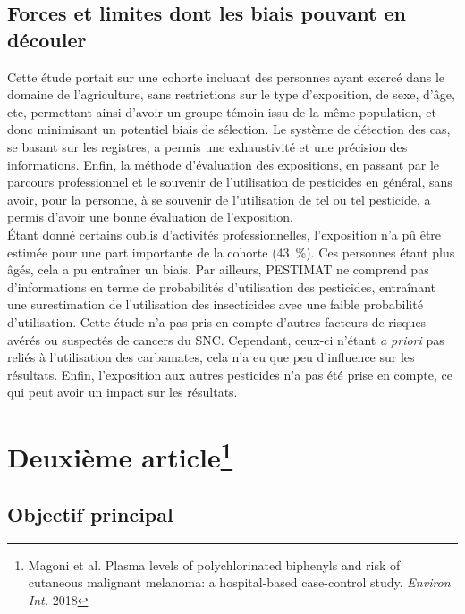 \documentclass[10pt]{article}
\begin{document}
\subsection{Forces et limites dont les biais pouvant en découler}
Cette étude portait sur une cohorte incluant des personnes ayant exercé dans le domaine de l'agriculture, sans restrictions sur le type d'exposition, de sexe, d'âge, etc, permettant ainsi d'avoir un groupe témoin issu de la même population, et donc minimisant un potentiel biais de sélection. Le système de détection des cas, se basant sur les registres, a permis une exhaustivité et une précision des informations. Enfin, la méthode d'évaluation des expositions, en passant par le parcours professionnel et le souvenir de l'utilisation de pesticides en général, sans avoir, pour la personne, à se souvenir de l'utilisation de tel ou tel pesticide, a permis d'avoir une bonne évaluation de l'exposition.\\

\'{E}tant donné certains oublis d'activités professionnelles, l'exposition n'a pû être estimée pour une part importante de la cohorte (43~\%). Ces personnes étant plus âgés, cela a pu entraîner un biais. Par ailleurs, PESTIMAT ne comprend pas d'informations en terme de probabilités d'utilisation des pesticides, entraînant une surestimation de l'utilisation des insecticides avec une faible probabilité d'utilisation. Cette étude n'a pas pris en compte d'autres facteurs de risques avérés ou suspectés de cancers du SNC. Cependant, ceux-ci n'étant \emph{a priori} pas reliés à l'utilisation des carbamates, cela n'a eu que peu d'influence sur les résultats. Enfin, l'exposition aux autres pesticides n'a pas été prise en compte, ce qui peut avoir un impact sur les résultats. 

\newpage
\section{Deuxième article\protect\footnote{Magoni et al. Plasma levels of polychlorinated biphenyls and risk of cutaneous malignant melanoma: a hospital-based case-control study. \emph{Environ Int.} 2018}}
\subsection{Objectif principal}
\end{document}
